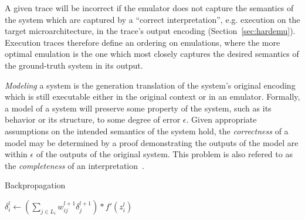 A given trace will be incorrect if the emulator does not capture the semantics of the system which are captured by a ``correct interpretation'', e.g. execution on the target microarchitecture, in the trace's output encoding (Section~\ref{sec:hardemu}).
Execution traces therefore define an ordering on emulations, where the more optimal emulation is the one which most closely captures the desired semantics of the ground-truth system in its output.

\emph{Modeling} a system is the generation translation of the system's original encoding which is still executable either in the original context or in an emulator.
Formally, a model of a system will preserve some property of the system, such as its behavior or its structure, to some degree of error $\epsilon$.
Given appropriate assumptions on the intended semantics of the system hold, the \emph{correctness} of a model may be determined by a proof demonstrating the outputs of the model are within $\epsilon$ of the outputs of the original system.
This problem is also refered to as the \emph{completeness} of an interpretation~\cite{campion2022partial}.

\begin{algorithm}
\caption{Backpropagation}
\label{alg:backprop}
\begin{algorithmic}[1]
		\State $\delta_{i}^{l} \gets (\sum_{j \in L_{i}} w_{ij}^{l+1} \delta_{j}^{l+1}) * f'(z_{i}^{l})$
	\EndFor
\EndFor
\EndProcedure
\end{algorithmic}
\end{algorithm}



